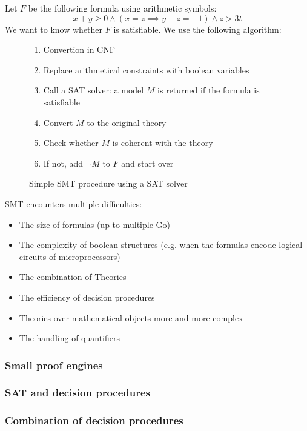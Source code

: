 \documentclass[toc]{../cs-classes/cs-classes}
\begin{document}
Let $F$ be the following formula using arithmetic symbols:
\begin{equation*}
    x+y\geq 0 \land (x=z \implies y+z=-1) \land z > 3t
\end{equation*}
We want to know whether $F$ is satisfiable.
We use the following algorithm:
\begin{figure}[!ht]
    \centering
    \begin{minipage}{0.77\textwidth}
    \begin{enumerate}
        \item Convertion in CNF
        \item Replace arithmetical constraints with boolean variables
        \item Call a SAT solver: a model $M$ is returned if the formula is satisfiable
        \item Convert $M$ to the original theory
        \item Check whether $M$ is coherent with the theory
        \item If not, add $\lnot M$ to $F$ and start over
    \end{enumerate}
    \end{minipage}
    \caption{Simple SMT procedure using a SAT solver}
\end{figure}

SMT encounters multiple difficulties:
\begin{itemize}
    \item The size of formulas (up to multiple Go)
    \item The complexity of boolean structures (e.g. when the formulas encode logical circuits of microprocessors)
    \item The combination of Theories
    \item The efficiency of decision procedures
    \item Theories over mathematical objects more and more complex
    \item The handling of quantifiers
\end{itemize}

\subsubsection{Small proof engines}

\subsubsection{SAT and decision procedures}

\subsubsection{Combination of decision procedures}
\end{document}
